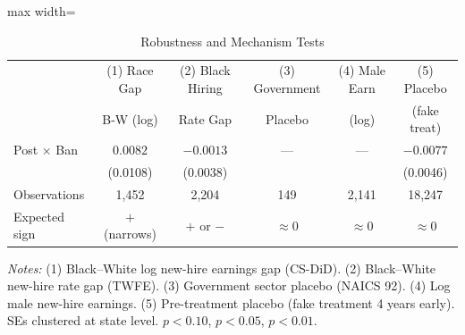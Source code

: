 \begin{table}[htbp]
\centering
\caption{Robustness and Mechanism Tests}
\label{tab:robustness}
\begin{adjustbox}{max width=\textwidth}
\begin{threeparttable}
\begin{tabular}{lccccc}
\toprule
 & (1) Race Gap & (2) Black Hiring & (3) Government & (4) Male Earn & (5) Placebo \\
 & B-W (log) & Rate Gap & Placebo & (log) & (fake treat) \\
\midrule
Post $\times$ Ban & $0.0082$ & $-0.0013$ & --- & --- & $-0.0077$ \\
 & (0.0108) & (0.0038) &  &  & (0.0046) \\
\midrule
Observations & 1,452 & 2,204 & 149 & 2,141 & 18,247 \\
Expected sign & $+$ (narrows) & $+$ or $-$ & $\approx 0$ & $\approx 0$ & $\approx 0$ \\
\bottomrule
\end{tabular}
\begin{tablenotes}[flushleft]
\footnotesize
\item \textit{Notes:} (1) Black--White log new-hire earnings gap (CS-DiD). (2) Black--White new-hire rate gap (TWFE). (3) Government sector placebo (NAICS 92). (4) Log male new-hire earnings. (5) Pre-treatment placebo (fake treatment 4 years early). SEs clustered at state level. \sym{*} $p<0.10$, \sym{**} $p<0.05$, \sym{***} $p<0.01$.
\end{tablenotes}
\end{threeparttable}
\end{adjustbox}
\end{table}
